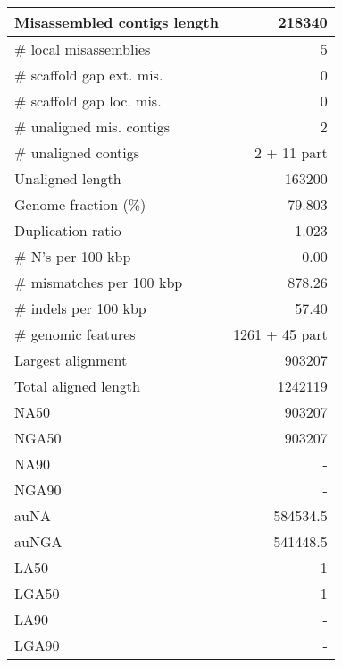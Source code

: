 \documentclass[12pt,a4paper]{article}
\begin{document}
\begin{table}[ht]
\begin{center}
\begin{tabular}{|l*{1}{|r}|}
Misassembled contigs length & 218340 \\ \hline
\# local misassemblies & 5 \\ \hline
\# scaffold gap ext. mis. & 0 \\ \hline
\# scaffold gap loc. mis. & 0 \\ \hline
\# unaligned mis. contigs & 2 \\ \hline
\# unaligned contigs & 2 + 11 part \\ \hline
Unaligned length & 163200 \\ \hline
Genome fraction (\%) & 79.803 \\ \hline
Duplication ratio & 1.023 \\ \hline
\# N's per 100 kbp & 0.00 \\ \hline
\# mismatches per 100 kbp & 878.26 \\ \hline
\# indels per 100 kbp & 57.40 \\ \hline
\# genomic features & 1261 + 45 part \\ \hline
Largest alignment & 903207 \\ \hline
Total aligned length & 1242119 \\ \hline
NA50 & 903207 \\ \hline
NGA50 & 903207 \\ \hline
NA90 & - \\ \hline
NGA90 & - \\ \hline
auNA & 584534.5 \\ \hline
auNGA & 541448.5 \\ \hline
LA50 & 1 \\ \hline
LGA50 & 1 \\ \hline
LA90 & - \\ \hline
LGA90 & - \\ \hline
\end{tabular}
\end{center}
\end{table}
\end{document}
